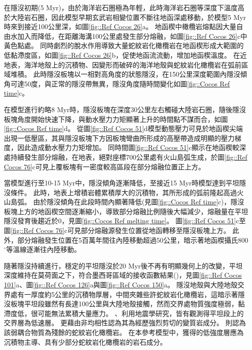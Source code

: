 在隱沒初期(5 Myr)，由於海洋岩石圈極為年輕，此時海洋岩石圈等深度下溫度高於大陸岩石圈，因此模型早期玄武岩相變位置不斷往地函深處移動，於模型5 Myr時來到接近100公里深，如圖\ref{fig::Ref Cocos 26}a。
地函楔中橄欖岩熔點因大量自由水加入而降低，在距離海溝100公里處發生部分熔融，如圖\ref{fig::Ref Cocos 26}c中黃色點處。
同時劇烈的脫水作用導致大量蛇紋岩化橄欖岩在地函楔形成大範圍的低黏滯度區，如圖\ref{fig::Ref Cocos 26}b，促使地函流流動，增加地函楔溫度。
在近地表，海洋地殼上的沉積物、因變形而破碎的海洋地殼與蛇紋岩化橄欖岩在弧前區域堆積。
此時隱沒板塊以一相對高角度的狀態隱沒，在150公里深度範圍內隱沒傾角可達50度，與正常的隱沒帶無異，隱沒角度隨時間變化如圖\ref{fig::Cocos Ref time}c。

在模型進行約略8 Myr時，隱沒板塊在深度30公里左右觸碰大陸岩石圈，隨後隱沒板塊角度開始快速下降，與動水壓力力矩顯著上升的時間點不謀而合，如圖\ref{fig::Cocos Ref time}d。
從圖\ref{fig::Ref Cocos 51}d模型動態壓力可見於地函楔尖端出現一低壓區，其與隱沒板塊下方因板塊彎曲所形成的高壓帶造成明顯的壓力梯度，因此造成動水壓力力矩增加。
同時間圖\ref{fig::Ref Cocos 51}c顯示在地函楔較深處持續發生部分熔融，在地表，絕對座標700公里處有火山島弧生成，於圖\ref{fig::Ref Cocos 76}c可見上覆板塊有一密度較高區段在部分熔融位置正上方。

當模型進行至10-15 Myr中，隱沒傾角逐漸降低，至接近15 Myr時模型達到平坦隱沒條件。
此時，地表上增積岩體累積厚大的沉積物，其所形成的弧前隆起高過火山島弧。
由於隱沒傾角在此段時間內顯著降低(見圖\ref{fig::Cocos Ref time}c)，隱沒板塊上方的地函楔空間逐漸縮小，導致部分熔融比例隨後大幅減少，熔融量在平坦隱沒發育後趨近於0，見圖\ref{fig::Cocos Ref melting time}。
圖\ref{fig::Ref Cocos 51}c至圖\ref{fig::Ref Cocos 76}c可見部分熔融源發生位置從地函轉移至隱沒板塊上方。
此外，部分熔融發生位置在5百萬年間往內陸移動超過50公里，暗示著地函楔攝氏800$^{\circ}$等溫線逐漸往內陸移動。

隨著隱沒持續進行，穩定的平坦隱沒於20 Myr後不再有明顯幾何上的改變，平坦深度維持在莫荷面之下，符合墨西哥區域的接收函數結果(\citealp{PerezCampos2008})，見圖\ref{fig::Ref Cocos 101}a、圖\ref{fig::Ref Cocos 126}a與圖\ref{fig::Ref Cocos 150}a。
隱沒地殼與大陸地殼交界處有一厚度約5公里的沉積物厚層，中間夾雜些許蛇紋岩化橄欖岩，這暗示著隱沒板塊平坦段雖然有長達100公里與大陸地殼接觸，然而交界處物質強度極弱，黏滯度低，很可能無法累積大量應力。
\citealp{Song2009}、\citealp{Song2012SC}利用地震學研究，皆有觀測得平坦段上的交界層為低速層。
\citealp{Song2012SC}更藉由非均相性認為其為經歷強烈剪切的變質岩成分。
\citealp{Manea2017}則認為該弱耦合物質為殘餘的蛇紋岩化橄欖岩。
在本參考模型中，獲得的低強度層應為沉積物主導、具有少部分蛇紋岩化橄欖岩的岩石成分。

